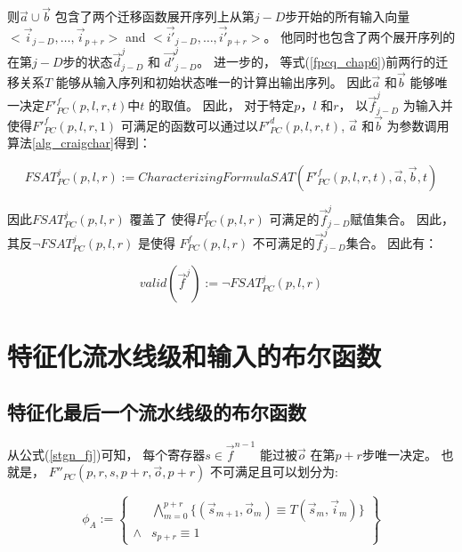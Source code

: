 则$\vec{a}\cup\vec{b}$ 包含了两个迁移函数展开序列上从第$j-D$步开始的所有输入向量$<\vec{i}_{j-D},\dots,\vec{i}_{p+r}>$ and $<\vec{i'}_{j-D},\dots,\vec{i'}_{p+r}>$。
他同时也包含了两个展开序列的在第$j-D$步的状态$\vec{d}^j_{j-D}$ 和 $\vec{d'}^j_{j-D}$。
进一步的，
等式(\ref{fpcq_chap6})前两行的迁移关系$T$
能够从输入序列和初始状态唯一的计算出输出序列。
因此$\vec{a}$ 和$\vec{b}$ 能够唯一决定$F'^f_{PC}(p,l,r,t)$中$t$ 的取值。
因此，
对于特定$p$，$l$ 和$r$，
以$\vec{f}^j_{j-D}$ 为输入并使得$F'^f_{PC}(p,l,r,1)$ 可满足的函数可以通过以$F'^d_{PC}(p,l,r,t)$, $\vec{a}$ 和$\vec{b}$ 为参数调用算法\ref{alg_craigchar}得到：

\begin{equation}\label{fsat_pc_chap6}
FSAT^j_{PC}(p,l,r):=CharacterizingFormulaSAT(F'^f_{PC}(p,l,r,t),\vec{a},\vec{b},t)
\end{equation}

因此$FSAT^j_{PC}(p,l,r)$ 覆盖了
使得$F^f_{PC}(p,l,r)$ 可满足的$\vec{f}^j_{j-D}$赋值集合。
因此，
其反$\neg FSAT^j_{PC}(p,l,r)$ 是使得
$F^f_{PC}(p,l,r)$ 不可满足的$\vec{f}^j_{j-D}$集合。
因此有：

\begin{equation}
valid(\vec{f}^j):=\neg FSAT^j_{PC}(p,l,r)
\end{equation}





\section{特征化流水线级和输入的布尔函数}\label{sec_char}
\subsection{特征化最后一个流水线级的布尔函数}

从公式(\ref{stgn_fj})可知，
每个寄存器$s\in \vec{f}^{n-1}$ 能过被$\vec{o}$ 在第$p+r$步唯一决定。
也就是，
$F''_{PC}(p,r,s,p+r,\vec{o},p+r)$ 不可满足且可以划分为:

\begin{equation}
 \phi_A :=
 \left\{
\begin{array}{cc}
&\bigwedge_{m=0}^{p+r}
\{
(\vec{s}_{m+1},\vec{o}_m)\equiv T(\vec{s}_m,\vec{i}_m)
\}
\\
\wedge& s_{p+r}\equiv 1
\end{array}
\right\}
\end{equation}

